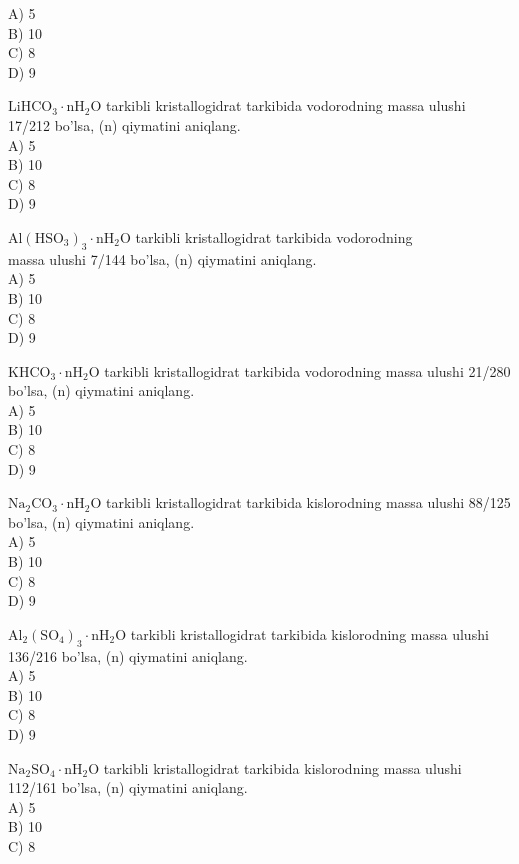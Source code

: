 A) 5\\
B) 10\\
C) 8\\
D) 9
  \item $\mathrm{LiHCO}_{3} \cdot \mathrm{nH}_{2} \mathrm{O}$ tarkibli kristallogidrat tarkibida vodorodning massa ulushi 17/212 bo'lsa, (n) qiymatini aniqlang.\\
A) 5\\
B) 10\\
C) 8\\
D) 9
  \item $\mathrm{Al}\left(\mathrm{HSO}_{3}\right)_{3} \cdot \mathrm{nH}_{2} \mathrm{O}$ tarkibli kristallogidrat tarkibida vodorodning\\
massa ulushi 7/144 bo'lsa, (n) qiymatini aniqlang.\\
A) 5\\
B) 10\\
C) 8\\
D) 9
  \item $\mathrm{KHCO}_{3} \cdot \mathrm{nH}_{2} \mathrm{O}$ tarkibli kristallogidrat tarkibida vodorodning massa ulushi 21/280 bo'lsa, (n) qiymatini aniqlang.\\
A) 5\\
B) 10\\
C) 8\\
D) 9
  \item $\mathrm{Na}_{2} \mathrm{CO}_{3} \cdot \mathrm{nH}_{2} \mathrm{O}$ tarkibli kristallogidrat tarkibida kislorodning massa ulushi 88/125 bo'lsa, (n) qiymatini aniqlang.\\
A) 5\\
B) 10\\
C) 8\\
D) 9
  \item $\mathrm{Al}_{2}\left(\mathrm{SO}_{4}\right)_{3} \cdot \mathrm{nH}_{2} \mathrm{O}$ tarkibli kristallogidrat tarkibida kislorodning massa ulushi 136/216 bo'lsa, (n) qiymatini aniqlang.\\
A) 5\\
B) 10\\
C) 8\\
D) 9
  \item $\mathrm{Na}_{2} \mathrm{SO}_{4} \cdot \mathrm{nH}_{2} \mathrm{O}$ tarkibli kristallogidrat tarkibida kislorodning massa ulushi 112/161 bo'lsa, (n) qiymatini aniqlang.\\
A) 5\\
B) 10\\
C) 8\\
